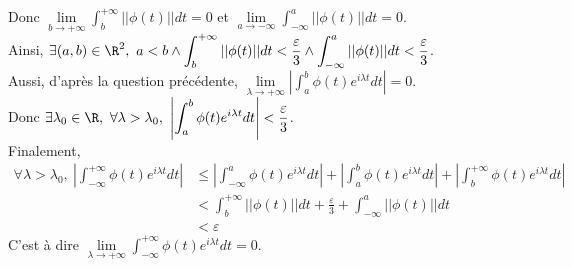 \documentclass{book}
\begin{document}
\begin{itemize}[leftmargin=*]
		Donc $\lim\limits_{b\to +\infty}\displaystyle\int_b^{+\infty}||\phi(t)||dt=0$ et $\lim\limits_{a\to -\infty}\displaystyle\int_{-\infty}^a||\phi(t)||dt=0$.\\
		Ainsi, $\exists (a,b)\in \R^2,\ a<b\land\displaystyle\int_b^{+\infty}||\phi(t)||dt<\frac{\varepsilon}{3}\land\displaystyle\int_{-\infty}^a||\phi(t)||dt<\frac{\varepsilon}{3}$.\\
		Aussi, d'après la question précédente, $\lim\limits_{\lambda\to +\infty}\left|\displaystyle\int_a^b\phi(t)e^{i\lambda t}dt\right|=0$.\\
		Donc $\exists \lambda_0\in \R,\ \forall \lambda>\lambda_0,\ \left|\displaystyle\int_a^b\phi(t)e^{i\lambda t}dt\right|<\displaystyle\frac{\varepsilon}{3}$.\\
		Finalement,
		\begin{align*}
			\forall \lambda>\lambda_0,\ \left|\displaystyle\int_{-\infty}^{+\infty}\phi(t)e^{i\lambda t}dt\right|&\leq \left|\displaystyle\int_{-\infty}^a\phi(t)e^{i\lambda t}dt\right|+\left|\displaystyle\int_a^b\phi(t)e^{i\lambda t}dt\right|+\left|\displaystyle\int_b^{+\infty}\phi(t)e^{i\lambda t}dt\right|\\
			&<\displaystyle\int_b^{+\infty}||\phi(t)||dt+\frac{\varepsilon}{3}+\displaystyle\int_{-\infty}^a||\phi(t)||dt\\
			&<\varepsilon
		\end{align*}
		C'est à dire $\lim\limits_{\lambda\to +\infty}\displaystyle\int_{-\infty}^{+\infty}\phi(t)e^{i\lambda t}dt=0$.
	\end{itemize}
	
\end{document}
